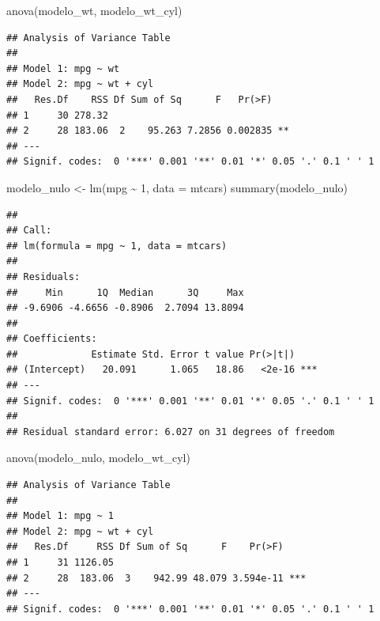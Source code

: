 \documentclass[
  12pt,
]{book}
\newenvironment{Shaded}{\begin{snugshade}}{\end{snugshade}}
\newcommand{\AttributeTok}[1]{\textcolor[rgb]{0.77,0.63,0.00}{#1}}
\newcommand{\DecValTok}[1]{\textcolor[rgb]{0.00,0.00,0.81}{#1}}
\newcommand{\FunctionTok}[1]{\textcolor[rgb]{0.00,0.00,0.00}{#1}}
\newcommand{\NormalTok}[1]{#1}
\newcommand{\OtherTok}[1]{\textcolor[rgb]{0.56,0.35,0.01}{#1}}
\newcommand{\SpecialCharTok}[1]{\textcolor[rgb]{0.00,0.00,0.00}{#1}}
\begin{document}
\begin{Shaded}
\begin{Highlighting}[]
\FunctionTok{anova}\NormalTok{(modelo\_wt, modelo\_wt\_cyl)}
\end{Highlighting}
\end{Shaded}

\begin{verbatim}
## Analysis of Variance Table
## 
## Model 1: mpg ~ wt
## Model 2: mpg ~ wt + cyl
##   Res.Df    RSS Df Sum of Sq      F   Pr(>F)   
## 1     30 278.32                                
## 2     28 183.06  2    95.263 7.2856 0.002835 **
## ---
## Signif. codes:  0 '***' 0.001 '**' 0.01 '*' 0.05 '.' 0.1 ' ' 1
\end{verbatim}

\begin{Shaded}
\begin{Highlighting}[]
\NormalTok{modelo\_nulo }\OtherTok{\textless{}{-}} \FunctionTok{lm}\NormalTok{(mpg }\SpecialCharTok{\textasciitilde{}} \DecValTok{1}\NormalTok{, }\AttributeTok{data =}\NormalTok{ mtcars)}
\FunctionTok{summary}\NormalTok{(modelo\_nulo)}
\end{Highlighting}
\end{Shaded}

\begin{verbatim}
## 
## Call:
## lm(formula = mpg ~ 1, data = mtcars)
## 
## Residuals:
##     Min      1Q  Median      3Q     Max 
## -9.6906 -4.6656 -0.8906  2.7094 13.8094 
## 
## Coefficients:
##             Estimate Std. Error t value Pr(>|t|)    
## (Intercept)   20.091      1.065   18.86   <2e-16 ***
## ---
## Signif. codes:  0 '***' 0.001 '**' 0.01 '*' 0.05 '.' 0.1 ' ' 1
## 
## Residual standard error: 6.027 on 31 degrees of freedom
\end{verbatim}

\begin{Shaded}
\begin{Highlighting}[]
\FunctionTok{anova}\NormalTok{(modelo\_nulo, modelo\_wt\_cyl)}
\end{Highlighting}
\end{Shaded}

\begin{verbatim}
## Analysis of Variance Table
## 
## Model 1: mpg ~ 1
## Model 2: mpg ~ wt + cyl
##   Res.Df     RSS Df Sum of Sq      F    Pr(>F)    
## 1     31 1126.05                                  
## 2     28  183.06  3    942.99 48.079 3.594e-11 ***
## ---
## Signif. codes:  0 '***' 0.001 '**' 0.01 '*' 0.05 '.' 0.1 ' ' 1
\end{verbatim}
\end{document}
